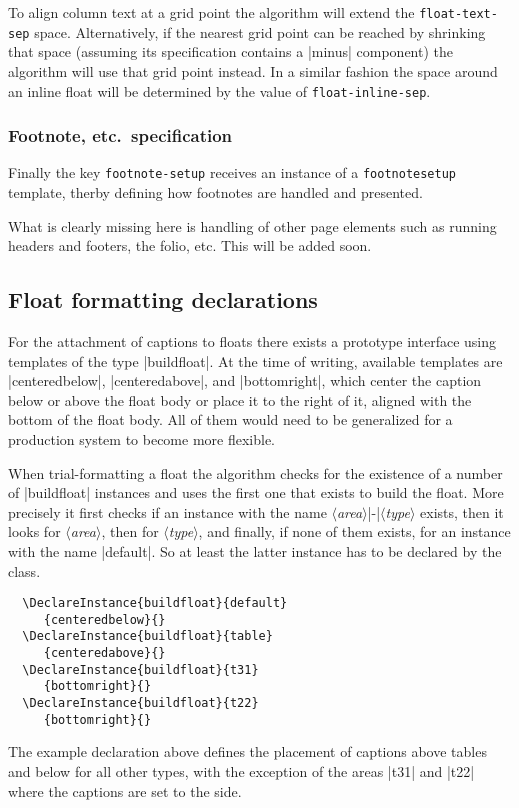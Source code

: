 \documentclass[twocolumn]{article}
\newcommand\meta[1]{\mbox{$\langle$\textit{#1}$\rangle$}}
\begin{document}
To align column text at a grid point the algorithm will extend the
\texttt{float-text-sep} space. Alternatively, if the nearest grid
point can be reached by shrinking that space (assuming its
specification contains a |minus| component) the algorithm will use
that grid point instead. In a similar fashion the space around an
inline float will be determined by the value of
\texttt{float-inline-sep}.



\subsubsection{Footnote, etc.~specification}

Finally the key \texttt{footnote-setup} receives an instance of a
\texttt{footnotesetup} template, therby defining how footnotes are
handled and presented.

What is clearly missing here is handling of other page elements such
as running headers and footers, the folio, etc. This will be added
soon.


\subsection{Float formatting declarations}

For the attachment of captions to floats there exists a prototype
interface using templates of the type |buildfloat|. At the time of
writing, available templates are |centeredbelow|, |centeredabove|, and
|bottomright|, which center the caption below or above the float body
or place it to the right of it, aligned with the bottom of the float
body. All of them would need to be generalized for a production
system to become more flexible.

When trial-formatting a float the algorithm checks for the existence
of a number of |buildfloat| instances and uses the first one that
exists to build the float. More precisely it first checks if an
instance with the name \meta{area}|-|\meta{type} exists, then it looks
for \meta{area}, then for \meta{type}, and finally, if none of them
exists, for an instance with the name |default|. So at least the latter
instance has to be declared by the class.
\begin{verbatim}
  \DeclareInstance{buildfloat}{default}
     {centeredbelow}{}
  \DeclareInstance{buildfloat}{table}
     {centeredabove}{}
  \DeclareInstance{buildfloat}{t31}
     {bottomright}{}
  \DeclareInstance{buildfloat}{t22}
     {bottomright}{}
\end{verbatim}
The example declaration above defines the placement of captions above
tables and below for all other types, with the exception of the areas |t31|
and |t22| where the captions are set to the side.
\end{document}
